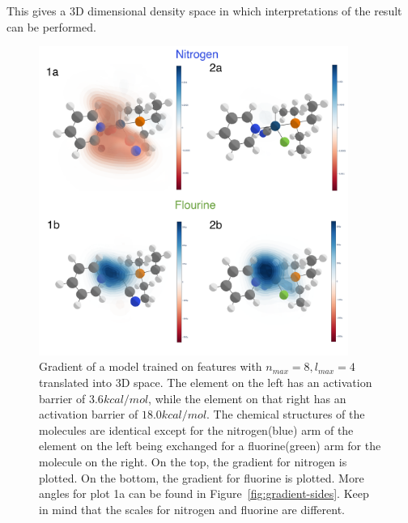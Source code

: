 This gives a 3D dimensional density space in which interpretations of the result can be performed.
\begin{figure}
  \centering
  \includegraphics[width=0.9\textwidth]{figures/evaluation/GradientComp.png}
  \caption[Comparison of local gradients]{
      Gradient of a model trained on features with $n_{max}=8, l_{max}=4$ translated into 3D space.
      The element on the left has an activation barrier of $3.6 kcal/mol$, while the element on that right
      has an activation barrier of $18.0 kcal/mol$.
      The chemical structures of the molecules are identical except for the nitrogen(blue) arm of the element
      on the left being exchanged for a fluorine(green) arm for the molecule on the right.
      On the top, the gradient for nitrogen is plotted. On the bottom, the gradient for fluorine is plotted.
      More angles for plot 1a can be found in Figure~\ref{fig:gradient-sides}.
      Keep in mind that the scales for nitrogen and fluorine are different.
   }
  \label{fig:snap-gradient}
\end{figure}

